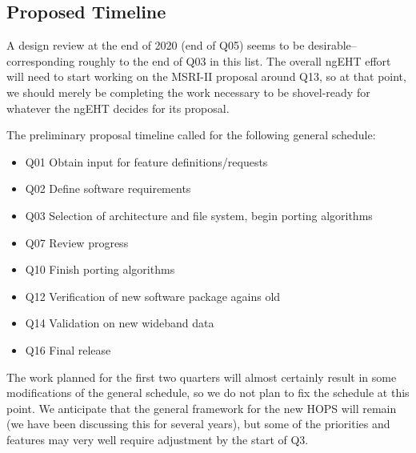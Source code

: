 \subsection{Proposed Timeline}
\label{sec:timeline}

A design review at the end of 2020 (end of Q05) seems to be
desirable--corresponding roughly to the end of Q03 in this list.  The overall
ngEHT effort will need to start working on the MSRI-II proposal around Q13,
so at that point, we should merely be completing the work necessary to be
shovel-ready for whatever the ngEHT decides for its proposal.%

The preliminary proposal timeline called for the following general
schedule:
\begin{itemize}[itemsep=-1ex,label={}]
 \item Q01  Obtain input for feature definitions/requests
 \item Q02  Define software requirements
 \item Q03  Selection of architecture and file system, begin porting algorithms
 \item Q07  Review progress
 \item Q10  Finish porting algorithms
 \item Q12  Verification of new software package agains old
 \item Q14  Validation on new wideband data
 \item Q16  Final release
\end{itemize}
The work planned for the first two quarters will almost certainly result
in some modifications of the general schedule, so we do not plan to fix
the schedule at this point.  We anticipate that the general framework for
the new HOPS will remain (we have been discussing this for several years),
but some of the priorities and features may very well require adjustment
by the start of Q3.

%
%
